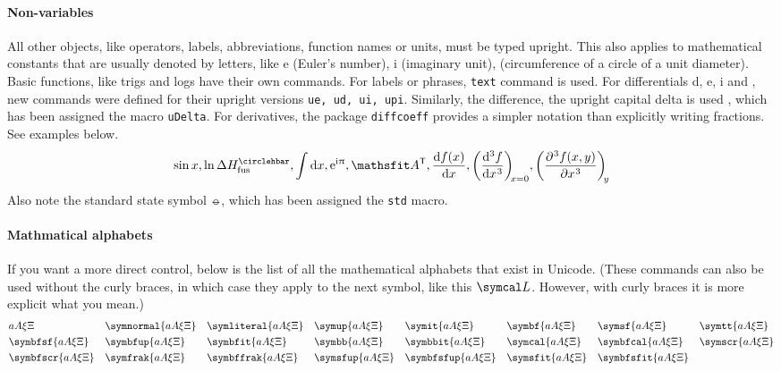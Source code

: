 \documentclass[11pt]{article}
\begin{document}
\paragraph{Non-variables} All other objects, like operators, labels, abbreviations, function names or units, must be typed upright. This also applies to mathematical constants that are usually denoted by letters, like e (Euler's number), i (imaginary unit), \upi (circumference of a circle of a unit diameter). Basic functions, like trigs and logs have their own commands. For labels or phrases, \texttt{text} command is used. For differentials d, e, i and \upi, new commands were defined for their upright versions \texttt{ue, ud, ui, upi}. Similarly, the difference, the upright capital delta is used \uDelta, which has been assigned the macro \texttt{uDelta}. For derivatives, the package \texttt{diffcoeff} provides a simpler notation than explicitly writing fractions. See examples below.
\[
\sin x, \ln \uDelta H_\text{fus}^\std,\int \ud x, \ue^{\ui \upi}, \mat{A}^\transp, \diff{f(x)}{x}, \diff[3]{f}{x}[x=0], \diffp[3]{f(x,y)}{x}[y]
\]
Also note the standard state symbol $\circlehbar$, which has been assigned the \texttt{std} macro.

\paragraph{Mathmatical alphabets} If you want a more direct control, below is the list of all the mathematical alphabets that exist in Unicode. (These commands can also be used without the curly braces, in which case they apply to the next symbol, like this $\symcal L$. However, with curly braces it is more explicit what you mean.)
\begin{align*}
    &a A \xi \Xi                &
    &\symnormal{a A \xi \Xi}    &
    &\symliteral{a A \xi \Xi}   &
    &\symup{a A \xi \Xi}    &
    &\symit{a A \xi \Xi}    &
    &\symbf{a A \xi \Xi}   &
    &\symsf{a A \xi \Xi}    &
    &\symtt{a A \xi \Xi}    \\
    &\symbfsf{a A \xi \Xi}   &
    &\symbfup{a A \xi \Xi}   &
    &\symbfit{a A \xi \Xi}   &
    &\symbb{a A \xi \Xi}   &
    &\symbbit{a A \xi \Xi}   &
    &\symcal{a A \xi \Xi}   &
    &\symbfcal{a A \xi \Xi}   &
    &\symscr{a A \xi \Xi}    \\
    &\symbfscr{a A \xi \Xi}   &
    &\symfrak{a A \xi \Xi}   &
    &\symbffrak{a A \xi \Xi}   &
    &\symsfup{a A \xi \Xi}   &
    &\symbfsfup{a A \xi \Xi}    &
    &\symsfit{a A \xi \Xi}    &
    &\symbfsfit{a A \xi \Xi} \\
\end{align*}
\end{document}
